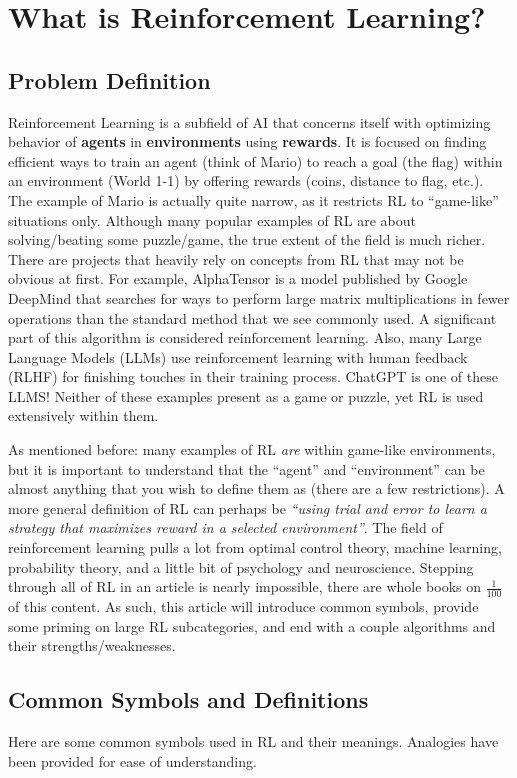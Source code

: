 \section{What is Reinforcement Learning?}
\subsection{Problem Definition}
    \large Reinforcement Learning is a subfield of AI that concerns itself with optimizing behavior of \textbf{agents} in \textbf{environments} using \textbf{rewards}. It is focused on finding efficient ways to train an agent (think of Mario) to reach a goal (the flag) within an environment (World 1-1) by offering rewards (coins, distance to flag, etc.). The example of Mario is actually quite narrow, as it restricts RL to ``game-like'' situations only. Although many popular examples of RL are about solving/beating some puzzle/game, the true extent of the field is much richer. There are projects that heavily rely on concepts from RL that may not be obvious at first. For example, AlphaTensor is a model published by Google DeepMind that searches for ways to perform large matrix multiplications in fewer operations than the standard method that we see commonly used. A significant part of this algorithm is considered reinforcement learning. Also, many Large Language Models (LLMs) use reinforcement learning with human feedback (RLHF) for finishing touches in their training process. ChatGPT is one of these LLMS! Neither of these examples present as a game or puzzle, yet RL is used extensively within them. 
    
    As mentioned before: many examples of RL \textit{are} within game-like environments, but it is important to understand that the ``agent'' and ``environment'' can be almost anything that you wish to define them as (there are a few restrictions). A more general definition of RL can perhaps be \textit{``using trial and error to learn a strategy that maximizes reward in a selected environment''}. The field of reinforcement learning pulls a lot from optimal control theory, machine learning, probability theory, and a little bit of psychology and neuroscience. Stepping through all of RL in an article is nearly impossible, there are whole books on $\frac{1}{100}$ of this content. As such, this article will introduce common symbols, provide some priming on large RL subcategories, and end with a couple algorithms and their strengths/weaknesses.

\subsection{Common Symbols and Definitions}
    \large Here are some common symbols used in RL and their meanings. Analogies have been provided for ease of understanding.

